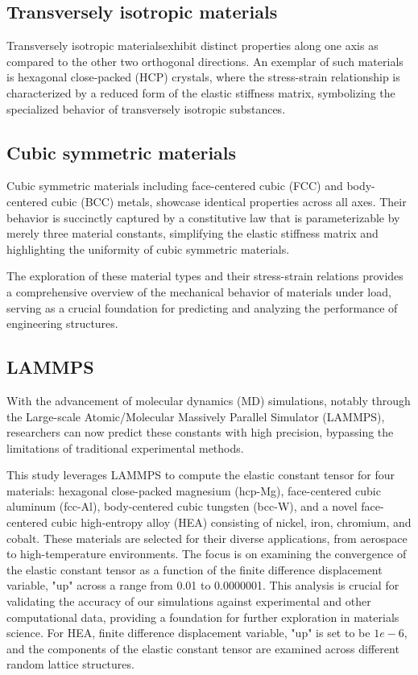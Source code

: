 \documentclass[a4paper,11pt]{article} %
\begin{document}
\subsection*{Transversely isotropic materials} Transversely isotropic materialsexhibit distinct properties along one axis as compared to the other two orthogonal directions. An exemplar of such materials is hexagonal close-packed (HCP) crystals, where the stress-strain relationship is characterized by a reduced form of the elastic stiffness matrix, symbolizing the specialized behavior of transversely isotropic substances.

\subsection*{Cubic symmetric materials} Cubic symmetric materials including face-centered cubic (FCC) and body-centered cubic (BCC) metals, showcase identical properties across all axes. Their behavior is succinctly captured by a constitutive law that is parameterizable by merely three material constants, simplifying the elastic stiffness matrix and highlighting the uniformity of cubic symmetric materials.

The exploration of these material types and their stress-strain relations provides a comprehensive overview of the mechanical behavior of materials under load, serving as a crucial foundation for predicting and analyzing the performance of engineering structures.

\subsection*{LAMMPS} With the advancement of molecular dynamics 
(MD) simulations, notably through the Large-scale Atomic/Molecular Massively Parallel Simulator
(LAMMPS), researchers can now predict these constants with high precision, bypassing the 
limitations of traditional experimental methods.

This study leverages LAMMPS to compute the elastic constant tensor for four 
materials: hexagonal close-packed magnesium (hcp-Mg), face-centered cubic aluminum 
(fcc-Al), body-centered cubic tungsten (bcc-W), and a novel face-centered cubic 
high-entropy alloy (HEA) consisting of nickel, iron, chromium, and cobalt. 
These materials are selected for their diverse applications, from aerospace to 
high-temperature environments. The focus is on examining the convergence of
the elastic constant tensor as a function of the finite difference displacement 
variable, "up" across a range from 0.01 to 0.0000001. This analysis is crucial for
validating the accuracy of our simulations against experimental and other 
computational data, providing a foundation for further exploration in materials science.
For HEA,  finite difference displacement 
variable, "up" is set to be $1e-6$, and the components of the elastic constant tensor are examined across different random lattice structures.
\end{document}
